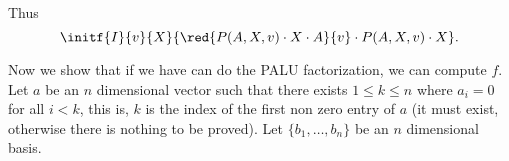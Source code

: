 Thus $$\initf{I}{v}{X}{\red{P(A,X,v)\cdot X\cdot A}{v}\cdot P(A,X,v)\cdot X}.$$

Now we show that if we have can do the PALU factorization, we can compute $f$. Let $a$ be an $n$ dimensional vector such that there exists $1\leq k\leq n$ where $a_i=0$ for all $i<k$, this is, $k$ is the index of the first non zero entry of $a$ (it must exist, otherwise there is nothing to be proved). Let $\lbrace b_1, \ldots, b_n\rbrace$ be an $n$ dimensional basis.